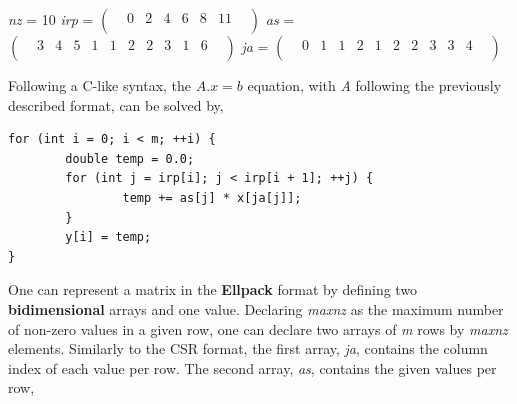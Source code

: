 \documentclass[12pt]{article}
\begin{document}
\begin{center}
\textit{nz}  =  10 
\linebreak
\linebreak
\textit{irp}  =   
$
\begin{pmatrix}
    & 0 & 2 & 4 & 6 & 8 & 11 & \\
\end{pmatrix}
$
\linebreak
\linebreak
\textit{as}  =   
$
\begin{pmatrix}
    & 3 & 4 & 5 & 1 & 1 & 2 & 2 & 3 & 1 & 6 & \\
\end{pmatrix}
$
\linebreak
\linebreak
\textit{ja}  =   
$
\begin{pmatrix}
    & 0 & 1 & 1 & 2 & 1 & 2 & 2 & 3 & 3 & 4 & \\
\end{pmatrix}
$
\linebreak
\end{center}

\par Following a C-like syntax, the $A . x = b$ equation, with \textit{A} following the previously described format, can be solved by,

\begin{lstlisting}[style=centered]
for (int i = 0; i < m; ++i) {
		double temp = 0.0;
		for (int j = irp[i]; j < irp[i + 1]; ++j) {
				temp += as[j] * x[ja[j]];
		}
		y[i] = temp;
}
\end{lstlisting}

\par One can represent a matrix in the \textbf{Ellpack} format by defining two \textbf{bidimensional} arrays and one value. Declaring \textit{maxnz} as the maximum number of non-zero values in a given row, one can declare two arrays of \textit{m} rows by \textit{maxnz} elements. Similarly to the CSR format, the first array, \textit{ja}, contains the column index of each value per row. The second array, \textit{as}, contains the given values per row,
\end{document}
